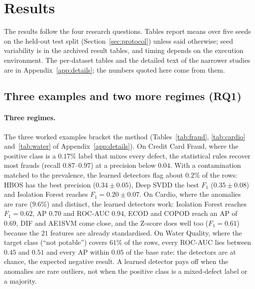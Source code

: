 \documentclass[conference]{IEEEtran}
\begin{document}
\section{Results}
\label{sec:experiments}
The results follow the four research questions. Tables report means over five seeds on the held-out
test split (Section~\ref{sec:protocol}) unless said otherwise; seed variability is in the archived
result tables, and timing depends on the execution environment. The per-dataset tables and the
detailed text of the narrower studies are in Appendix~\ref{app:details}; the numbers quoted here
come from them.

\subsection{Three examples and two more regimes (RQ1)}
\label{sec:rq1}
\paragraph{Three regimes.} The three worked examples bracket the method (Tables~\ref{tab:fraud},
\ref{tab:cardio} and~\ref{tab:water} of Appendix~\ref{app:details}). On Credit Card Fraud, where
the positive class is a $0.17\%$ label that mixes every defect, the statistical rules recover most
frauds (recall $0.87$--$0.97$) at a precision below $0.04$. With a contamination matched to the
prevalence, the learned detectors flag about $0.2\%$ of the rows: HBOS has the best precision
($0.34 \pm 0.05$), Deep SVDD the best $F_1$ ($0.35 \pm 0.08$) and Isolation Forest reaches
$F_1 = 0.20 \pm 0.07$. On Cardio, where the anomalies are rare ($9.6\%$) and distinct, the learned
detectors work: Isolation Forest reaches $F_1 = 0.62$, AP $0.70$ and ROC-AUC $0.94$, ECOD and
COPOD reach an AP of $0.69$, DIF and AE1SVM come close, and the Z-score does well too
($F_1 = 0.61$) because the $21$ features are already standardised. On Water Quality, where the
target class (``not potable'') covers $61\%$ of the rows, every ROC-AUC lies between $0.45$ and
$0.51$ and every AP within $0.05$ of the base rate: the detectors are at chance, the expected
negative result. A learned detector pays off when the anomalies are rare outliers, not when the
positive class is a mixed-defect label or a majority.
\end{document}
